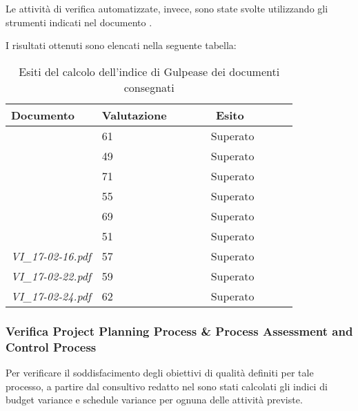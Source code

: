 		Le attività di verifica automatizzate, invece, sono state svolte utilizzando gli strumenti indicati nel documento \NdP. 
		
		I risultati ottenuti sono elencati nella seguente tabella:
		\begin{table}[H]
		\begin{tabular}{|l|l|l|}
		\hline
		\textbf{Documento} 		&\textbf{Valutazione} &\textbf{~~~~~~Esito~~~~~~} \\
		\hline
		\PdQ 					&61		&~~~~~~Superato~~~~~~\\
		\NdP 					&49		&~~~~~~Superato~~~~~~\\
		\AdR 					&71		&~~~~~~Superato~~~~~~\\
		\PdP 					&55		&~~~~~~Superato~~~~~~\\
		\ST 					&69		&~~~~~~Superato~~~~~~\\	
		\Glossario 				&51		&~~~~~~Superato~~~~~~\\
		\textit{VI_17-02-16.pdf} 		&57		&~~~~~~Superato~~~~~~\\
		\textit{VI_17-02-22.pdf} 		&59		&~~~~~~Superato~~~~~~\\
		\textit{VI_17-02-24.pdf} 		&62		&~~~~~~Superato~~~~~~\\
		\hline
		\end{tabular}
		\caption{Esiti del calcolo dell'indice di Gulpease dei documenti consegnati}
		\end{table}
		
		\subsubsection{Verifica Project Planning Process \& Process Assessment and Control Process}
		Per verificare il soddisfacimento degli obiettivi di qualità definiti per tale processo, a partire dal consultivo redatto nel \PdP{} sono stati calcolati gli indici di budget variance e schedule variance per ognuna delle attività previste.
		
